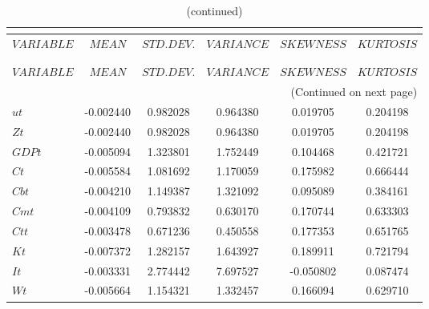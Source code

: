  
\begin{center}
\begin{longtable}{lccccc} 
\caption{MOMENTS OF SIMULATED VARIABLES}\\
 \label{Table:sim_moments}\\
\toprule 
$VARIABLE  $	 & 	 $            MEAN$	 & 	 $       STD. DEV.$	 & 	 $        VARIANCE$	 & 	 $        SKEWNESS$	 & 	 $        KURTOSIS$\\
\midrule \endfirsthead 
\caption{(continued)}\\
 \toprule \\ 
$VARIABLE  $	 & 	 $            MEAN$	 & 	 $       STD. DEV.$	 & 	 $        VARIANCE$	 & 	 $        SKEWNESS$	 & 	 $        KURTOSIS$\\
\midrule \endhead 
\midrule \multicolumn{6}{r}{(Continued on next page)} \\ \bottomrule \endfoot 
\bottomrule \endlastfoot 
$ut        $	 & 	       -0.002440	 & 	        0.982028	 & 	        0.964380	 & 	        0.019705	 & 	        0.204198 \\ 
$Zt        $	 & 	       -0.002440	 & 	        0.982028	 & 	        0.964380	 & 	        0.019705	 & 	        0.204198 \\ 
$GDPt      $	 & 	       -0.005094	 & 	        1.323801	 & 	        1.752449	 & 	        0.104468	 & 	        0.421721 \\ 
$Ct        $	 & 	       -0.005584	 & 	        1.081692	 & 	        1.170059	 & 	        0.175982	 & 	        0.666444 \\ 
$Cbt       $	 & 	       -0.004210	 & 	        1.149387	 & 	        1.321092	 & 	        0.095089	 & 	        0.384161 \\ 
$Cmt       $	 & 	       -0.004109	 & 	        0.793832	 & 	        0.630170	 & 	        0.170744	 & 	        0.633303 \\ 
$Ctt       $	 & 	       -0.003478	 & 	        0.671236	 & 	        0.450558	 & 	        0.177353	 & 	        0.651765 \\ 
$Kt        $	 & 	       -0.007372	 & 	        1.282157	 & 	        1.643927	 & 	        0.189911	 & 	        0.721794 \\ 
$It        $	 & 	       -0.003331	 & 	        2.774442	 & 	        7.697527	 & 	       -0.050802	 & 	        0.087474 \\ 
$Wt        $	 & 	       -0.005664	 & 	        1.154321	 & 	        1.332457	 & 	        0.166094	 & 	        0.629710 \\ 

\end{longtable}
\end{center}
